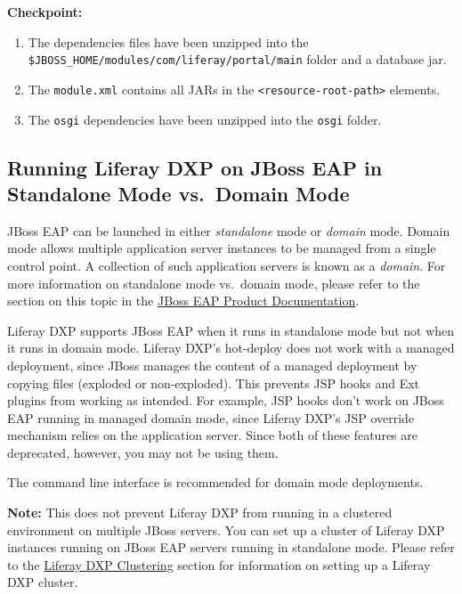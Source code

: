 \textbf{Checkpoint:}

\begin{enumerate}
\def\labelenumi{\arabic{enumi}.}
\tightlist
\item
  The dependencies files have been unzipped into the
  \texttt{\$JBOSS\_HOME/modules/com/liferay/portal/main} folder and a
  database jar.
\item
  The \texttt{module.xml} contains all JARs in the
  \texttt{\textless{}resource-root-path\textgreater{}} elements.
\item
  The \texttt{osgi} dependencies have been unzipped into the
  \texttt{osgi} folder.
\end{enumerate}

\subsection{Running Liferay DXP on JBoss EAP in Standalone Mode
vs.~Domain
Mode}\label{running-liferay-dxp-on-jboss-eap-in-standalone-mode-vs.-domain-mode}

JBoss EAP can be launched in either \emph{standalone} mode or
\emph{domain} mode. Domain mode allows multiple application server
instances to be managed from a single control point. A collection of
such application servers is known as a \emph{domain}. For more
information on standalone mode vs.~domain mode, please refer to the
section on this topic in the
\href{https://access.redhat.com/documentation/en-us/red_hat_jboss_enterprise_application_platform/7.1/html/introduction_to_jboss_eap/overview_of_jboss_eap\#operating_modes}{JBoss
EAP Product Documentation}.

Liferay DXP supports JBoss EAP when it runs in standalone mode but not
when it runs in domain mode. Liferay DXP's hot-deploy does not work with
a managed deployment, since JBoss manages the content of a managed
deployment by copying files (exploded or non-exploded). This prevents
JSP hooks and Ext plugins from working as intended. For example, JSP
hooks don't work on JBoss EAP running in managed domain mode, since
Liferay DXP's JSP override mechanism relies on the application server.
Since both of these features are deprecated, however, you may not be
using them.

The command line interface is recommended for domain mode deployments.

\noindent\hrulefill

\textbf{Note:} This does not prevent Liferay DXP from running in a
clustered environment on multiple JBoss servers. You can set up a
cluster of Liferay DXP instances running on JBoss EAP servers running in
standalone mode. Please refer to the
\href{/docs/7-1/deploy/-/knowledge_base/d/liferay-clustering}{Liferay
DXP Clustering} section for information on setting up a Liferay DXP
cluster.


